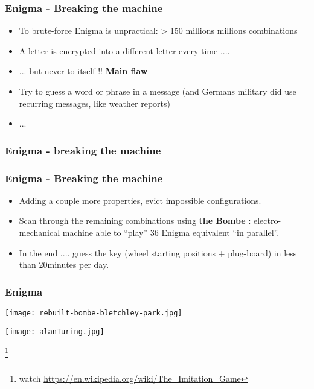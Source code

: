 \documentclass[
hyperref={pdfpagelabels=false}
,xcolor=table
]
{beamer}
\begin{document}
\begin{frame}
  \frametitle{Enigma - Breaking the machine}

  \begin{itemize}
  \item To brute-force Enigma is unpractical: > 150 millions millions combinations
  \item A letter is encrypted into a different letter every time ....
  \item ... but never to itself !! \textbf{Main flaw}
  \item Try to guess a word or phrase in a message (and Germans military did use recurring messages, like weather reports)
  \item ...
  \end{itemize}

\end{frame}

\begin{frame} 
  \frametitle{Enigma - breaking the machine}
  \begin{center}
  \end{center}
\end{frame}

\begin{frame}[fragile]
  \frametitle{Enigma - Breaking the machine}

  \begin{itemize}
  \item Adding a couple more properties, evict impossible configurations. 
  \item Scan through the remaining combinations using \textbf{the Bombe} : electro-mechanical machine able to ``play'' 36 Enigma equivalent ``in parallel''. 
  \item In the end .... guess the key (wheel starting positions + plug-board) in less than 20minutes per day. 
  \end{itemize}
 
\end{frame}



\begin{frame}
    \frametitle{Enigma}
  \begin{minipage}{0.45\textwidth}
    \texttt{[image: rebuilt-bombe-bletchley-park.jpg]}
  \end{minipage}
  \hfill
  \begin{minipage}{0.45\textwidth}
    \texttt{[image: alanTuring.jpg]}
  \end{minipage}

  \footnote*{watch \url{https://en.wikipedia.org/wiki/The_Imitation_Game}}
\end{frame}
\end{document}

